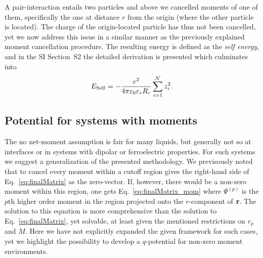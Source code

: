 \documentclass[
journal=jctcce,
manuscript=letter]{achemso}
\begin{document}
A pair-interaction entails two particles and above we cancelled moments of one of them, specifically the one at distance $r$ from the origin (where the other particle is located). The charge of the origin-located particle has thus not been cancelled, yet we now address this issue in a similar manner as the previously explained moment cancellation procedure. The resulting energy is defined as the \emph{self energy}, and in the SI Section~S2 the detailed derivation is presented which culminates into
\begin{equation}
\label{eq:self_energy}
E_{{\rm Self}} = -\frac{e^2}{4\pi\varepsilon_0\varepsilon_rR_c}\sum_{i = 1}^{\mathcal{N}} z_i^2.
\end{equation}

\subsection{Potential for systems with moments}

The no net-moment assumption is fair for many liquids, but generally not so at interfaces or in systems with dipolar or ferroelectric properties.
For such systems we suggest a generalization of the presented methodology.
We previsously noted that to cancel every moment within a cutoff region gives the right-hand side of Eq.~\ref{eq:finalMatrix} as the zero-vector.
If, however, there would be a non-zero moment within this region, one gets Eq.~\ref{eq:finalMatrix_mom} where $\Psi^{(p)}$ is the $p$th higher order moment in the region projected onto the $r$-component of ${\bf r}$.
The solution to this equation is more comprehensive than the solution to Eq.~\ref{eq:finalMatrix}, yet solvable, at least given the mentioned restrictions on $r_p$ and $M$.
Here we have not explicitly expanded the given framework for such cases, yet we highlight the possibility to develop a $q$-potential for non-zero moment environments.
\end{document}
